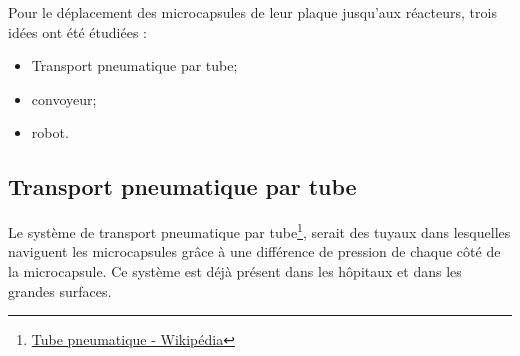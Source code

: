 Pour le déplacement des microcapsules de leur plaque jusqu'aux réacteurs, trois idées ont été étudiées : 
\begin{itemize}
    \item Transport pneumatique par tube;
    \item convoyeur;
    \item robot.
\end{itemize}
\subsection*{Transport pneumatique par tube}
Le système de transport pneumatique par tube\footnote{\href{https://fr.wikipedia.org/wiki/Tube_pneumatique}{Tube pneumatique - Wikipédia}}, serait des tuyaux dans lesquelles naviguent les microcapsules grâce à une différence de pression de chaque côté de la microcapsule. Ce système est déjà présent dans les hôpitaux et dans les grandes surfaces.
